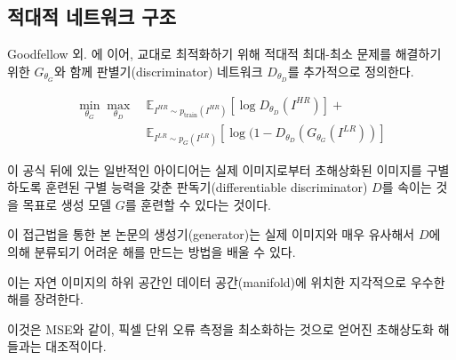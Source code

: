 \documentclass[10pt,twocolumn,letterpaper]{article}
\newcommand{\kor}[1]{#1}
\newcommand{\eng}[1]{}
\begin{document}
\subsection{\eng{Adversarial network architecture}\kor{적대적 네트워크 구조}}
\eng{
Following Goodfellow et al. \cite{Goodfellow14GAN} we further define a discriminator network $D_{\theta_D}$ which we optimize in an alternating manner along with $G_{\theta_G}$ to solve the adversarial min-max problem:
}\kor{
Goodfellow 외. \cite{Goodfellow14GAN}에 이어, 교대로 최적화하기 위해 적대적 최대-최소 문제를 해결하기 위한 $G_{\theta_G}$와 함께 판별기(discriminator) 네트워크 $D_{\theta_D}$를 추가적으로 정의한다.
}
\begin{equation}
\label{eq:minmax}
\begin{split}
\min_{\theta_G} \max_{\theta_D} ~& \mathbb{E}_{I^{HR}\sim p_\textrm{train}(I^{HR})} [ \log D_{\theta_D}(I^{HR}) ] + \\
& \mathbb{E}_{I^{LR}\sim p_G(I^{LR})} [ \log (1-D_{\theta_D}(G_{\theta_G}(I^{LR})) ]
\end{split}
\end{equation}
\eng{
The general idea behind this formulation is that it allows one to train a generative model $G$ with the goal of fooling a differentiable discriminator $D$ that is trained to distinguish super-resolved images from real images.
}\kor{
이 공식 뒤에 있는 일반적인 아이디어는 실제 이미지로부터 초해상화된 이미지를 구별하도록 훈련된 구별 능력을 갖춘 판독기(differentiable discriminator) $D$를 속이는 것을 목표로 생성 모델 $G$를 훈련할 수 있다는 것이다.
}
\eng{
With this approach our generator can learn to create solutions that are highly similar to real images and thus difficult to classify by $D$.
}\kor{
이 접근법을 통한 본 논문의 생성기(generator)는 실제 이미지와 매우 유사해서 $D$에 의해 분류되기 어려운 해를 만드는 방법을 배울 수 있다.
} \eng{
This encourages perceptually superior solutions residing in the subspace, the manifold, of natural images.
}\kor{
이는 자연 이미지의 하위 공간인 데이터 공간(manifold)에 위치한 지각적으로 우수한 해를 장려한다.
} \eng{
This is in contrast to \ac{SR} solutions obtained by minimizing pixel-wise error measurements, such as the \ac{MSE}.
}\kor{
이것은 \ac{MSE}와 같이, 픽셀 단위 오류 측정을 최소화하는 것으로 얻어진 \ac{초해상도화} 해들과는 대조적이다.
}
\end{document}
